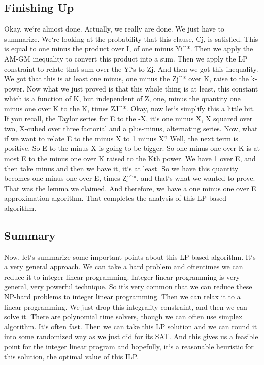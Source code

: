 \subsection{Finishing Up}
Okay, we`re almost done.
Actually, we really are done.
We just have to summarize.
We`re looking at the probability that this clause, Cj, is satisfied.
This is equal to one minus the product over I, of one minus Yi\textasciicircum{}*.
Then we apply the AM-GM inequality to convert this product into a sum.
Then we apply the LP constraint to relate that sum over the Yi`s to Zj.
And then we got this inequality.
We got that this is at least one minus, one minus the Zj\textasciicircum{}* over K, raise to the k-power.
Now what we just proved is that this whole thing is at least, this constant which is a function of K, but independent of Z, one, minus the quantity one minus one over K to the K, times ZJ\textasciicircum{}*.
Okay, now let`s simplify this a little bit.
If you recall, the Taylor series for E to the -X, it`s one minus X, X squared over two, X-cubed over three factorial and a plus-minus, alternating series.
Now, what if we want to relate E to the minus X to 1 minus X? Well, the next term is positive.
So E to the minus X is going to be bigger.
So one minus one over K is at most E to the minus one over K raised to the Kth power.
We have 1 over E, and then take minus and then we have it, it`s at least.
So we have this quantity becomes one minus one over E, times Zj\textasciicircum{}*, and that`s what we wanted to prove.
That was the lemma we claimed.
And therefore, we have a one minus one over E approximation algorithm.
That completes the analysis of this LP-based algorithm.

\subsection{Summary}
Now, let`s summarize some important points about this LP-based algorithm.
It`s a very general approach.
We can take a hard problem and oftentimes we can reduce it to integer linear programming.
Integer linear programming is very general, very powerful technique.
So it`s very common that we can reduce these NP-hard problems to integer linear programming.
Then we can relax it to a linear programming.
We just drop this integrality constraint, and then we can solve it.
There are polynomial time solvers, though we can often use simplex algorithm.
It`s often fast.
Then we can take this LP solution and we can round it into some randomized way as we just did for its SAT\@.
And this gives us a feasible point for the integer linear program and hopefully, it`s a reasonable heuristic for this solution, the optimal value of this ILP\@.

